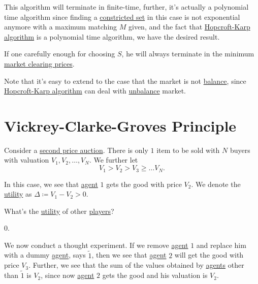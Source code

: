\begin{remark}
	This algorithm will terminate in finite-time, further, it's actually a polynomial time algorithm since finding a \hyperref[def:constricted-set]{constricted set}
	in this case is not exponential anymore with a maximum matching \(M\) given, and the fact that \hyperref[algo:Hopcroft-Karp-algorithm]{Hopcroft-Karp algorithm}
	is a polynomial time algorithm, we have the desired result.
\end{remark}

If one carefully enough for choosing \(S\), he will always terminate in the minimum \hyperref[note:market-clearing-prices]{market clearing prices}.

\begin{note}
	Note that it's easy to extend to the case that the market is not \hyperref[def:balance]{balance}, since
	\hyperref[algo:Hopcroft-Karp-algorithm]{Hopcroft-Karp algorithm} can deal with \hyperref[def:balance]{unbalance} market.
\end{note}

\section{Vickrey-Clarke-Groves Principle}
Consider a \hyperref[eg:second-price-auction]{second price auction}. There is only \(1\) item to be sold with \(N\) buyers with valuation
\(V_{1}, V_{2}, \ldots , V_{N}\). We further let
\[
	V_{1}>V_{2}>V_{3}\geq \ldots V_{N}.
\]

In this case, we see that \hyperref[def:player]{agent} \(1\) gets the good with price \(V_{2}\). We denote the \hyperref[def:reward]{utility}
as \(\Delta\coloneqq V_{1}-V_{2}>0\).

\begin{problem}
What's the \hyperref[def:reward]{utility} of other \hyperref[def:player]{players}?
\end{problem}
\begin{answer}
	\(0\).
\end{answer}

We now conduct a thought experiment. If we remove \hyperref[def:player]{agent} \(1\) and replace him with a dummy \hyperref[def:player]{agent},
says \(\tilde{1}\), then we see that \hyperref[def:player]{agent} \(2\) will get the good with price \(V_{3}\). Further, we see that the sum of
the values obtained by \hyperref[def:player]{agents} other than \(\tilde{1}\) is \(V_{2}\), since now \hyperref[def:player]{agent} \(2\) gets
the good and his valuation is \(V_{2}\).

